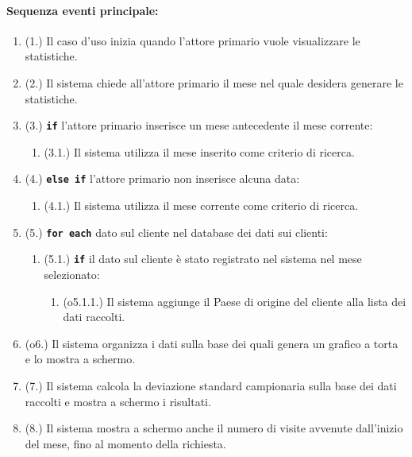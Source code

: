 \documentclass{article}
\begin{document}
	\paragraph{Sequenza eventi principale:}
	\begin{enumerate}[itemsep=8pt,parsep=0pt]
	    \item (1.) Il caso d'uso inizia quando l'attore primario vuole visualizzare le statistiche. 
		\item (2.) Il sistema chiede all'attore primario il mese nel quale desidera generare le statistiche.
		\item (3.) \texttt{\textbf{if}} l'attore primario inserisce un mese antecedente il mese corrente:
			\begin{enumerate}	[leftmargin=28pt]
				\item (3.1.) Il sistema utilizza il mese inserito come criterio di ricerca.
  			\end{enumerate}	
		\item (4.) \texttt{\textbf{else if}} l'attore primario non inserisce alcuna data:
			\begin{enumerate}	[leftmargin=28pt]
				\item (4.1.) Il sistema utilizza il mese corrente come criterio di ricerca.
  			\end{enumerate}

		\item (5.) \texttt{\textbf{for each}} dato sul cliente nel database dei dati sui clienti:
		    \begin{enumerate}	[leftmargin=28pt]
				\item (5.1.) \texttt{\textbf{if}} il dato sul cliente è stato registrato nel sistema nel mese selezionato:
					\begin{enumerate}	[leftmargin=28pt]
						\item (o5.1.1.) Il sistema aggiunge il Paese di origine del cliente alla lista dei dati raccolti.
		  			\end{enumerate}	
  		    \end{enumerate}

	    \item (o6.) Il sistema organizza i dati sulla base dei quali genera un grafico a torta e lo mostra a schermo.
	    \item (7.) Il sistema calcola la deviazione standard campionaria sulla base dei dati raccolti e mostra a schermo i risultati.
	    \item (8.) Il sistema mostra a schermo anche il numero di visite avvenute dall'inizio del mese, fino al momento della richiesta. %
	\end{enumerate}
	
\end{document}

